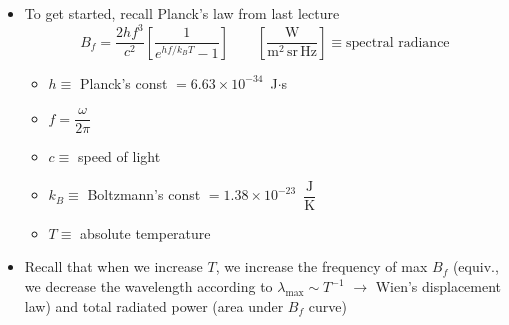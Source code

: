 \documentclass[11pt, oneside]{article}
\begin{document}
\begin{itemize}
	\item To get started, recall Planck's law from last lecture
	\begin{equation}
		\label{e:Bf}
		B_f = \frac{2hf^3}{c^2}\left[\frac{1}{e^{hf/k_BT} - 1}\right] \qquad \left[\frac{\text{W}}{\text{m}^2\,\text{sr}\,\text{Hz}}\right] \equiv \text{spectral radiance}
	\end{equation}
	\begin{itemize}
		\item[] $h \equiv$ Planck's const $= 6.63\times10^{-34}$~J$\cdot$s
		\item[] $f = \dfrac{\omega}{2\pi}$
		\item[] $c \equiv$ speed of light
		\item[] $k_B \equiv$ Boltzmann's const $= 1.38\times10^{-23}$~$\dfrac{\text{J}}{\text{K}}$
		\item[] $T \equiv$ absolute temperature
	\end{itemize}
	\item[--] Recall that when we increase $T$, we increase the frequency of max $B_f$ (equiv., we decrease the wavelength according to $\lambda_\mathrm{max} \sim T^{-1}$ $\rightarrow$ Wien's displacement law) and total radiated power (area under $B_f$ curve)
\end{itemize}
\end{document}
